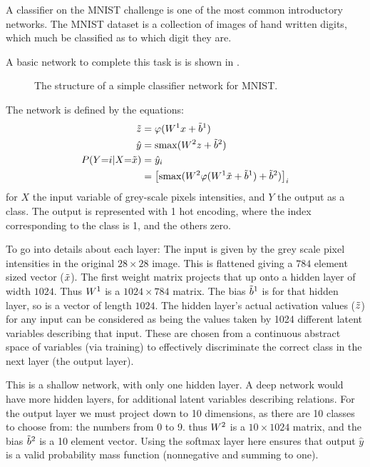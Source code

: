 \documentclass[12pt,parskip]{komatufte}
\begin{document}
A classifier on the MNIST challenge is one of the most common introductory networks.
The MNIST dataset is a collection of images of hand written digits, which much be classified as to which digit they are.

A basic network to complete this task is is shown in .

\begin{figure}
	\caption{The structure of a simple classifier network for MNIST.}
	\label{fig:mnistnetwork}
	
\end{figure}

The network is defined by the equations:
\begin{align}
\v z&=\varphi(\d W_1 x + \dv b_1) \\
\hat{y}&=\softmax(\d W_2 z + \dv b_2) \\
P(Y{=}i{\mid}X{=}\v x) &= \hat{y}_i \\
&= \left[\softmax(\d W_2 \varphi(\d W_1 \v x + \dv b_1)+\dv b_2)\right]_i
\end{align}
for $X$ the input variable of grey-scale pixels intensities, and $Y$ the output as a class.
The output is represented with 1 hot encoding, where the index corresponding to the class is 1, and the others zero.



To go into details about each layer:
The input is given by the grey scale pixel intensities in the original $28\times 28$ image.
This is flattened giving a $784$ element sized vector ($\tilde{x}$).
The first weight matrix projects that up onto a hidden layer  of width $1024$.
Thus $\d W_1$ is a $1024\times 784$ matrix.
The bias $\d {\v b}_1$ is for that hidden layer, so is a vector of length $1024$.
The hidden layer's actual activation values ($\tilde{z}$) for any input can be considered as being the values taken by 1024 different latent variables describing that input.
These are chosen  from a continuous abstract space of variables (via training) to effectively discriminate the correct class in the next layer (the output layer).

This is a shallow network, with only one hidden layer.
A deep network would have more hidden layers, for additional latent variables describing relations.
For the output layer we must project down to 10 dimensions, as there are 10 classes to choose from: the numbers from 0 to 9.
thus $\d W_2$ is a $10 \times 1024$ matrix,
and the bias $\dv b_2$ is a 10 element vector.
Using the softmax layer here ensures that output $\hat{y}$ is a valid probability mass function (nonnegative and summing to one).
\end{document}
